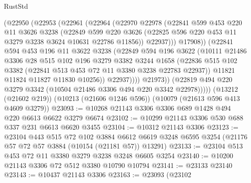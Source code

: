 \begin{lexlean}{RustStd}
\begin{coremodule}
{\begin{coremodule}
{{{{{{{{{{{{{{{{{{{{{{{{{{                  (@22950
                    (@22953
                      (@22961
                        (@22964
                          (@22970
                            @22978
                            (@22841
                              @599
                              @453
                              @220
                              @11
                              @3626
                              @3238
                              (@22849
                                @599
                                @220
                                @3626
                                (@22825 @596 @220 @453 @11 @3279 @3238 @3624 @10631 @22786 @11856))
                              @22937)))
                        @17908))
                    (@22841
                      @594
                      @453
                      @196
                      @11
                      @3622
                      @3238
                      (@22849
                        @594
                        @196
                        @3622
                        (@10111
                          @21486
                          @3306
                          @28
                          @515
                          @102
                          @196
                          @3279
                          @3382
                          @3244
                          @1658
                          (@22836
                            @515
                            @102
                            @3382
                            (@22841 @513 @453 @72 @11 @3380 @3238 @22783 @22937))
                          @11821
                          @11824
                          @11827
                          @11830
                          @10256))
                      @22937))))
              @21973))
          (@22819 @494 @220 @3279 @3342 (@10504 @21486 @3306 @494 @220 @3342 @22978)))))
    (@13212 (@21602 @219))
    (@10213 (@21606 @1246 @596))
    (@10079 (@21613 @596 @413 @4609 @3279))
@23093 := @10268 @21143 @3306 @3306 @689 @1428 @494 @220 @6613 @6622 @3279 @6674
@23102 := @10299 @21143 @3306 @530 @688 @337 @231 @6613 @6620 @3455
@23104 := @10312 @21143 @3306
@23123 := @23104
    @443
    @515
    @72
    @102
    @3884
    @6612
    @6619
    @3248
    @6595
    @3254
    (@21176 @57 @72 @57 @3884 (@10154 (@21181 @57)) @13291)
@23133 := @23104 @513 @453 @72 @11 @3380 @3279 @3238 @3248 @6605 @3254
@23140 := @10200 @21143 @3306 @72 @512 @3380 @10790 @10794
@23141 := @23133 @23140
@23143 := @10437 @21143 @3306
@23163 := @23093
    (@23102
}}}}}}}}}}}}}}}}}}}}}}}}}}
\end{coremodule}}
\end{coremodule}
\end{lexlean}
